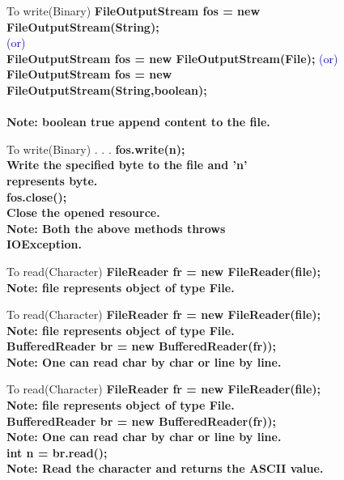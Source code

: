 \documentclass[aspectratio=169,14pt,usenames,dvipsnames]{beamer}
\newcommand\tab[1][1cm]{\hspace*{#1}}
\begin{document}
\begin{frame}{To write(Binary)}
\textbf{FileOutputStream fos = new FileOutputStream(String);}\\
\tab \tab \tab \tab \textcolor{blue}{(or)}\\
\textbf{FileOutputStream fos = new FileOutputStream(File);}
\tab \tab \tab \tab \textcolor{blue}{(or)}\\
\textbf{FileOutputStream fos = new}\\
\textbf{FileOutputStream(String,boolean);}\\
\vspace{1em}\\
\textbf{Note: boolean true append content to the file.}
\end{frame}


\begin{frame}{To write(Binary) . . .}
\textbf{fos.write(n);}\\
\textbf{Write the specified byte to the file and ’n’}\\
\textbf{represents byte.}\\
\vspace{1em}
\textbf{fos.close();}\\
\textbf{Close the opened resource.}\\
\vspace{1em}
\textbf{Note: Both the above methods throws}\\
\textbf{IOException.}\\
\end{frame}  


\begin{frame}{To read(Character)}
\textbf{FileReader fr = new FileReader(file);}\\
\textbf{Note: file represents object of type File.}\\
\end{frame}

\begin{frame}{To read(Character)}
\textbf{FileReader fr = new FileReader(file);}\\
\textbf{Note: file represents object of type File.}\\
\vspace{1em}
\textbf{BufferedReader br = new BufferedReader(fr));}\\
\textbf{Note: One can read char by char or line by line.}\\
\end{frame}

\begin{frame}{To read(Character)}
\textbf{FileReader fr = new FileReader(file);}\\
\textbf{Note: file represents object of type File.}\\
\vspace{1em}
\textbf{BufferedReader br = new BufferedReader(fr));}\\
\textbf{Note: One can read char by char or line by line.}\\
\vspace{1em}
\textbf{int n = br.read();}\\
\textbf{Note: Read the character and returns the ASCII value.}\\
\end{frame}
\end{document}
